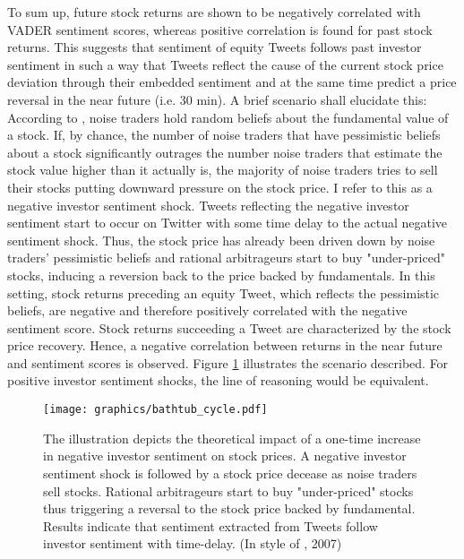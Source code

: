 \documentclass[a4paper,12pt]{article}%
\begin{document}
To sum up, future stock returns are shown to be negatively correlated with VADER sentiment scores, whereas positive correlation is found for past stock returns. This suggests that sentiment of equity Tweets follows past investor sentiment in such a way that Tweets reflect the cause of the current stock price deviation through their embedded sentiment and at the same time predict a price reversal in the near future (i.e. 30 min).
A brief scenario shall elucidate this: According to \citet{DeLong1990}, noise traders hold random beliefs about the fundamental value of a stock. If, by chance, the number of noise traders that have pessimistic beliefs about a stock significantly outrages the number noise traders that estimate the stock value higher than it actually is, the majority of noise traders tries to sell their stocks putting downward pressure on the stock price. I refer to this as a negative investor sentiment shock. Tweets reflecting the negative investor sentiment start to occur on Twitter with some time delay to the actual negative sentiment shock. Thus, the stock price has already been driven down by noise traders' pessimistic beliefs and rational arbitrageurs start to buy "under-priced" stocks, inducing a reversion back to the price backed by fundamentals. In this setting, stock returns preceding an equity Tweet, which reflects the pessimistic beliefs, are negative and therefore positively correlated with the negative sentiment score. Stock returns succeeding a Tweet are characterized by the stock price recovery. Hence, a negative correlation between returns in the near future and sentiment scores is observed. Figure \ref{fig:bathtubcycle} illustrates the scenario described. For positive investor sentiment shocks, the line of reasoning would be equivalent.

\begin{figure}
\captionsetup{justification=centering}
\centering
\texttt{[image: graphics/bathtub\_cycle.pdf]}
\caption[Theoretical Impact of Investor Sentiment on Stock Prices]{The illustration depicts the theoretical impact of a one-time increase in negative investor sentiment on stock prices. A negative investor sentiment shock is followed by a stock price decease as noise traders sell stocks. Rational arbitrageurs start to buy "under-priced" stocks thus triggering a reversal to the stock price backed by fundamental. Results indicate that sentiment extracted from Tweets follow investor sentiment with time-delay. 
(In style of \citeauthor{Tetlock2007}, 2007) \label{fig:bathtubcycle}}
\end{figure}
\end{document}
